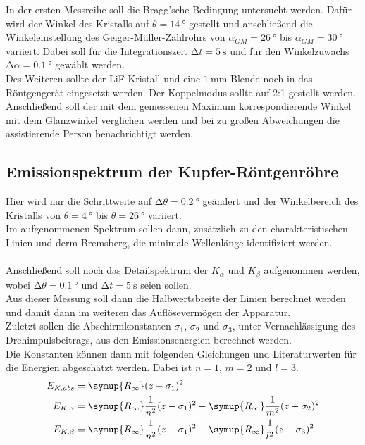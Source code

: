 In der ersten Messreihe soll die Bragg'sche Bedingung untersucht werden. 
Dafür wird der Winkel des Kristalls auf $\theta=\SI{14}{\degree}$ gestellt und anschließend die Winkeleinstellung des Geiger-Müller-Zählrohrs von $\alpha_{GM}=\SI{26}{\degree}$ bis $\alpha_{GM}=\SI{30}{\degree}$ variiert.
Dabei soll für die Integrationszeit $\increment t=\SI{5}{\second}$ und für den Winkelzuwachs $\increment \alpha=\SI{0.1}{\degree}$ gewählt werden.\\
Des Weiteren sollte der LiF-Kristall und eine $\SI{1}{\milli\metre}$ Blende noch in das Röntgengerät eingesetzt werden.
Der Koppelmodus sollte auf 2:1 gestellt werden.\\
Anschließend soll der mit dem gemessenen Maximum korrespondierende Winkel mit dem Glanzwinkel verglichen werden und bei zu großen Abweichungen die assistierende Person benachrichtigt werden.

\subsection{Emissionspektrum der Kupfer-Röntgenröhre}

\noindent
Hier wird nur die Schrittweite auf $\increment \theta=\SI{0.2}{\degree}$ geändert und der Winkelbereich des Kristalls von $\theta=\SI{4}{\degree}$ bis $\theta=\SI{26}{\degree}$ variiert.\\
Im aufgenommenen Spektrum sollen dann, zusätzlich zu den charakteristischen Linien und derm Bremsberg, die minimale Wellenlänge identifiziert werden.\\\\
Anschließend soll noch das Detailspektrum der $K_{\alpha}$ und $K_{\beta}$ aufgenommen werden, wobei $\increment \theta=\SI{0.1}{\degree}$ und $\increment t=\SI{5}{\second}$ seien sollen.\\
Aus dieser Messung soll dann die Halbwertsbreite der Linien berechnet werden und damit dann im weiteren das Auflösevermögen der Apparatur.\\
Zuletzt sollen die Abschirmkonstanten $\sigma_1$, $\sigma_2$ und $\sigma_3$, unter Vernachlässigung des Drehimpulsbeitrags, aus den Emissionsenergien berechnet werden. \\
Die Konstanten können dann mit folgenden Gleichungen und Literaturwerten für die Energien abgeschätzt werden. Dabei ist $n=1$, $m=2$ und $l=3$.
\begin{align*}
    E_{K,abs}&=\symup{R_\infty}(z-\sigma_1)^2\\
    E_{K,\alpha}&=\symup{R_\infty}\frac{1}{n^2}(z-\sigma_1)^2-\symup{R_\infty}\frac{1}{m^2}(z-\sigma_2)^2\\
    E_{K,\beta}&=\symup{R_\infty}\frac{1}{n^2}(z-\sigma_1)^2-\symup{R_\infty}\frac{1}{l^2}(z-\sigma_3)^2
\end{align*}

